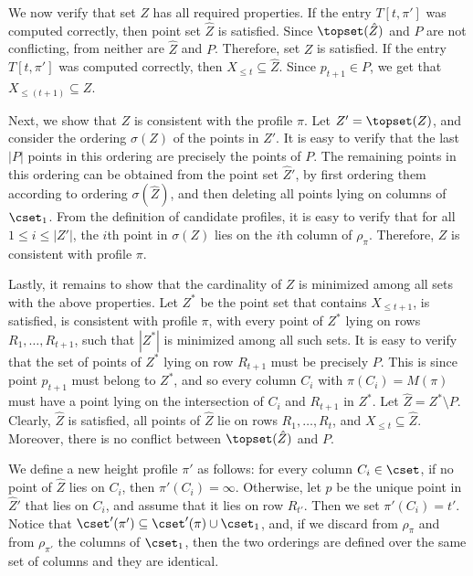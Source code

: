 We now verify that set $Z$ has all required properties. If the entry $T[t,\pi']$ was computed correctly, then point set $\hat Z$ is satisfied. Since $\topset(\hat Z)$ and $P$ are not conflicting, from  neither are $\hat Z$ and $P$. Therefore, set $Z$ is satisfied. 
If the entry $T[t,\pi']$ was computed correctly, then $X_{\leq t}\subseteq \hat Z$. Since $p_{t+1}\in P$, we get that $X_{\leq (t+1)}\subseteq Z$. 

Next, we show that $Z$ is consistent with the profile $\pi$. Let $Z'=\topset(Z)$, and consider the ordering $\sigma(Z)$ of the points in $Z'$. It is easy to verify that the last $|P|$ points in this ordering are precisely the points of $P$. The remaining points in this ordering can be obtained from the point set $\hat Z'$, by first ordering them according to ordering $\sigma(\hat Z)$, and then deleting all points lying on columns of $\cset_1$. From the definition of candidate profiles, it is easy to verify that for all $1\leq i\leq |Z'|$, the $i$th point in $\sigma(Z)$ lies on the $i$th column of $\rho_{\pi}$. Therefore, $Z$ is consistent with profile $\pi$.


Lastly, it remains to show that the cardinality of $Z$ is minimized among all sets with the above properties. Let $Z^*$ be the point set that contains $X_{\leq t+1}$, is satisfied, is consistent with profile $\pi$, with every point of $Z^*$ lying on rows $R_1,\ldots,R_{t+1}$,  such that $|Z^*|$ is minimized among all such sets. It is easy to verify that the set of points of $Z^*$ lying on row $R_{t+1}$ must be precisely $P$. This is since point $p_{t+1}$ must belong to $Z^*$, and so every column $C_i$ with $\pi(C_i)=M(\pi)$ must have a point lying on the intersection of $C_i$ and $R_{t+1}$ in $Z^*$. Let $\hat Z=Z^*\setminus P$.
Clearly, $\hat Z$ is satisfied, all points of $\hat Z$ lie on rows $R_1,\ldots,R_t$, and $X_{\leq t}\subseteq \hat Z$. Moreover, there is no conflict between $\topset(\hat Z)$ and $P$.

We define a new height profile $\pi'$ as follows: for every column $C_i\in \cset$, if no point of $\hat Z$ lies on $C_i$, then $\pi'(C_i)=\infty$. Otherwise, let $p$ be the unique point in $\hat Z'$ that lies on $C_i$, and assume that it lies on row $R_{t'}$. Then we set $\pi'(C_i)=t'$. Notice that $\cset'(\pi')\subseteq \cset'(\pi)\cup \cset_1$, and, if we discard from $\rho_{\pi}$ and from $\rho_{\pi'}$ the columns of $\cset_1$, then the two orderings are defined over the same set of columns and they are identical.

